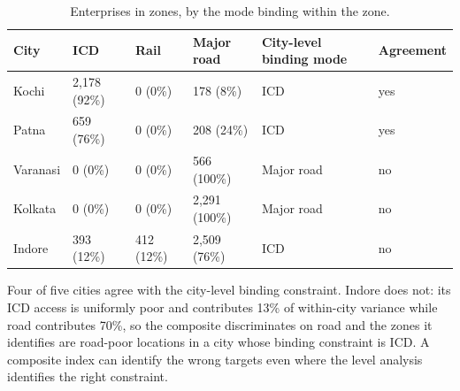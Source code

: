 \begin{table}[htbp]
\centering
\small
\caption{Enterprises in zones, by the mode binding within the zone.}
\label{tab:t17_zone_binding}
\begin{tabular}{llllll}
\toprule
City & ICD & Rail & Major road & City-level binding mode & Agreement \\
\midrule
Kochi & 2,178 (92\%) & 0 (0\%) & 178 (8\%) & ICD & yes \\
Patna & 659 (76\%) & 0 (0\%) & 208 (24\%) & ICD & yes \\
Varanasi & 0 (0\%) & 0 (0\%) & 566 (100\%) & Major road & no \\
Kolkata & 0 (0\%) & 0 (0\%) & 2,291 (100\%) & Major road & no \\
Indore & 393 (12\%) & 412 (12\%) & 2,509 (76\%) & ICD & no \\
\bottomrule
\end{tabular}
\begin{tablenotes}\footnotesize
\item Four of five cities agree with the city-level binding constraint. Indore does not: its ICD access is uniformly poor and contributes 13\% of within-city variance while road contributes 70\%, so the composite discriminates on road and the zones it identifies are road-poor locations in a city whose binding constraint is ICD. A composite index can identify the wrong targets even where the level analysis identifies the right constraint.
\end{tablenotes}
\end{table}
